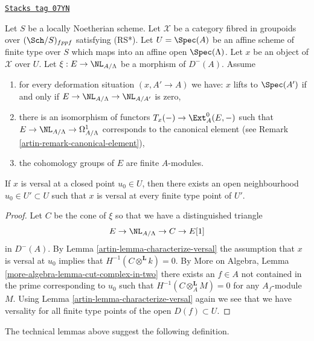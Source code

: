 \begin{lemma}[Openness]
\label{artin-lemma-openness}
\href{https://stacks.math.columbia.edu/tag/07YN}{\texttt{Stacks tag 07YN}}

Let $S$ be a locally Noetherian scheme. Let $\mathcal{X}$ be a category
fibred in groupoids over $(\Sch/S)_{fppf}$ satisfying (RS*).
Let $U = \Spec(A)$ be an affine scheme of finite type over $S$ which maps
into an affine open $\Spec(\Lambda)$. Let $x$ be an object of $\mathcal{X}$
over $U$. Let $\xi : E \to \NL_{A/\Lambda}$ be a morphism of $D^{-}(A)$.
Assume
\begin{enumerate}
\item[(i)] for every deformation situation $(x, A' \to A)$ we have:
$x$ lifts to $\Spec(A')$ if and only if
$E \to \NL_{A/\Lambda} \to \NL_{A/A'}$ is zero,
\item[(ii)] there is an isomorphism of functors
$T_x(-) \to \Ext^0_A(E, -)$
such that $E \to \NL_{A/\Lambda} \to \Omega^1_{A/\Lambda}$
corresponds to the canonical element (see
Remark \ref{artin-remark-canonical-element}),
\item[(iii)] the cohomology groups of $E$ are finite $A$-modules.
\end{enumerate}
If $x$ is versal at a closed point $u_0 \in U$,
then there exists an open neighbourhood $u_0 \in U' \subset U$
such that $x$ is versal at every finite type point of $U'$.
\end{lemma}

\begin{proof}

Let $C$ be the cone of $\xi$ so that we have a distinguished triangle
$$
E \to \NL_{A/\Lambda} \to C \to E[1]
$$
in $D^{-}(A)$. By Lemma \ref{artin-lemma-characterize-versal}
the assumption that $x$ is versal at $u_0$ implies that
$H^{-1}(C \otimes^\mathbf{L} k) = 0$. By
More on Algebra, Lemma \ref{more-algebra-lemma-cut-complex-in-two}
there exists an $f \in A$ not contained in the prime corresponding to
$u_0$ such that $H^{-1}(C \otimes^\mathbf{L}_A M) = 0$ for
any $A_f$-module $M$. Using
Lemma \ref{artin-lemma-characterize-versal}
again we see that we have versality for all finite type points of
the open $D(f) \subset U$.
\end{proof}

The technical lemmas above suggest the following definition.

